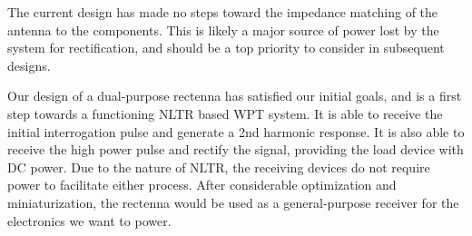 The current design has made no steps toward the impedance matching of the antenna to the components. This is likely a major source of power lost by the system for rectification, and should be a top priority to consider in subsequent designs.

Our design of a dual-purpose rectenna has satisfied our initial goals, and is a first step towards a functioning NLTR based WPT system.  It is able to receive the initial interrogation pulse and generate a 2nd harmonic response. It is also able to receive the high power pulse and rectify the signal, providing the load device with DC power. Due to the nature of NLTR, the receiving devices do not require power to facilitate either process. After considerable optimization and miniaturization, the rectenna would be used as a general-purpose receiver for the electronics we want to power.
